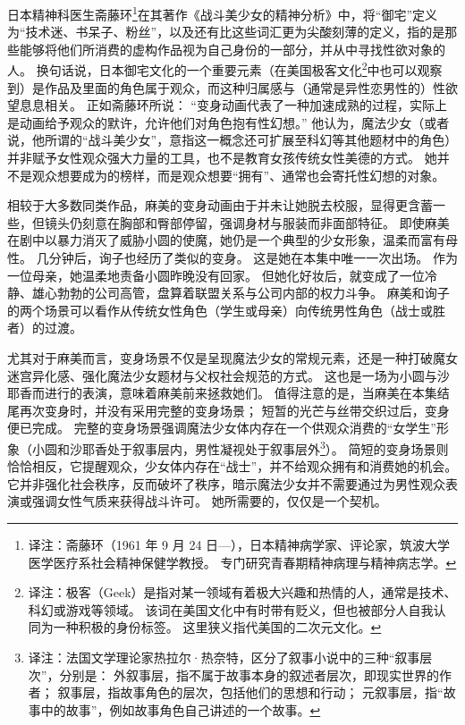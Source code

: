 日本精神科医生斋藤环\footnote{%
    译注：斋藤环（1961 年 9 月 24 日—），日本精神病学家、评论家，筑波大学医学医疗系社会精神保健学教授。
    专门研究青春期精神病理与精神病志学。
}在其著作《战斗美少女的精神分析》中，将“御宅”定义为“技术迷、书呆子、粉丝”，以及还有比这些词汇更为尖酸刻薄的定义，指的是那些能够将他们所消费的虚构作品视为自己身份的一部分，并从中寻找性欲对象的人。
换句话说，日本御宅文化的一个重要元素（在美国极客文化\footnote{%
    译注：极客（Geek）是指对某一领域有着极大兴趣和热情的人，通常是技术、科幻或游戏等领域。
    该词在美国文化中有时带有贬义，但也被部分人自我认同为一种积极的身份标签。
    这里狭义指代美国的二次元文化。
}中也可以观察到）是作品及里面的角色属于观众，而这种归属感与（通常是异性恋男性的）性欲望息息相关。
正如斋藤环所说：
“变身动画代表了一种加速成熟的过程，实际上是动画给予观众的默许，允许他们对角色抱有性幻想。”
他认为，魔法少女（或者说，他所谓的“战斗美少女”，意指这一概念还可扩展至科幻等其他题材中的角色）并非赋予女性观众强大力量的工具，也不是教育女孩传统女性美德的方式。
她并不是观众想要成为的榜样，而是观众想要“拥有”、通常也会寄托性幻想的对象\cite{ref19}。

相较于大多数同类作品，麻美的变身动画由于并未让她脱去校服，显得更含蓄一些，但镜头仍刻意在胸部和臀部停留，强调身材与服装而非面部特征。
即使麻美在剧中以暴力消灭了威胁小圆的使魔，她仍是一个典型的少女形象，温柔而富有母性。
几分钟后，询子也经历了类似的变身。
这是她在本集中唯一一次出场。
作为一位母亲，她温柔地责备小圆昨晚没有回家。
但她化好妆后，就变成了一位冷静、雄心勃勃的公司高管，盘算着联盟关系与公司内部的权力斗争。
麻美和询子的两个场景可以看作从传统女性角色（学生或母亲）向传统男性角色（战士或胜者）的过渡。

尤其对于麻美而言，变身场景不仅是呈现魔法少女的常规元素，还是一种打破魔女迷宫异化感、强化魔法少女题材与父权社会规范的方式。
这也是一场为小圆与沙耶香而进行的表演，意味着麻美前来拯救她们。
值得注意的是，当麻美在本集结尾再次变身时，并没有采用完整的变身场景；
短暂的光芒与丝带交织过后，变身便已完成。
完整的变身场景强调魔法少女体内存在一个供观众消费的“女学生”形象（小圆和沙耶香处于叙事层内，男性凝视处于叙事层外\footnote{%
    译注：法国文学理论家热拉尔·热奈特，区分了叙事小说中的三种“叙事层次”，分别是：
    外叙事层，指不属于故事本身的叙述者层次，即现实世界的作者；
    叙事层，指故事角色的层次，包括他们的思想和行动；
    元叙事层，指“故事中的故事”，例如故事角色自己讲述的一个故事。
}）。
简短的变身场景则恰恰相反，它提醒观众，少女体内存在“战士”，并不给观众拥有和消费她的机会。
它并非强化社会秩序，反而破坏了秩序，暗示魔法少女并不需要通过为男性观众表演或强调女性气质来获得战斗许可。
她所需要的，仅仅是一个契机。

